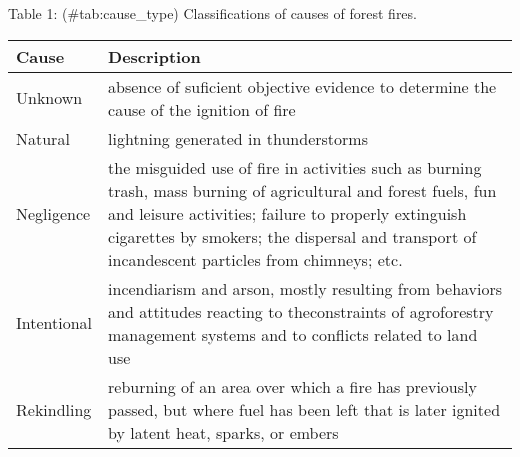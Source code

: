 \documentclass[
  12pt,
]{report}
\begin{document}
Table 1: (\#tab:cause\_type) Classifications of causes of forest fires.

\begin{longtable}[]{@{}ll@{}}
\toprule
\begin{minipage}[b]{0.11\columnwidth}\raggedright
Cause\strut
\end{minipage} & \begin{minipage}[b]{0.83\columnwidth}\raggedright
Description\strut
\end{minipage}\tabularnewline
\midrule
\endhead
\begin{minipage}[t]{0.11\columnwidth}\raggedright
Unknown\strut
\end{minipage} & \begin{minipage}[t]{0.83\columnwidth}\raggedright
absence of suficient objective evidence to determine the cause of the
ignition of fire\strut
\end{minipage}\tabularnewline
\begin{minipage}[t]{0.11\columnwidth}\raggedright
Natural\strut
\end{minipage} & \begin{minipage}[t]{0.83\columnwidth}\raggedright
lightning generated in thunderstorms\strut
\end{minipage}\tabularnewline
\begin{minipage}[t]{0.11\columnwidth}\raggedright
Negligence\strut
\end{minipage} & \begin{minipage}[t]{0.83\columnwidth}\raggedright
the misguided use of fire in activities such as burning trash, mass
burning of agricultural and forest fuels, fun and leisure activities;
failure to properly extinguish cigarettes by smokers; the dispersal and
transport of incandescent particles from chimneys; etc.\strut
\end{minipage}\tabularnewline
\begin{minipage}[t]{0.11\columnwidth}\raggedright
Intentional\strut
\end{minipage} & \begin{minipage}[t]{0.83\columnwidth}\raggedright
incendiarism and arson, mostly resulting from behaviors and attitudes
reacting to theconstraints of agroforestry management systems and to
conflicts related to land use\strut
\end{minipage}\tabularnewline
\begin{minipage}[t]{0.11\columnwidth}\raggedright
Rekindling\strut
\end{minipage} & \begin{minipage}[t]{0.83\columnwidth}\raggedright
reburning of an area over which a fire has previously passed, but where
fuel has been left that is later ignited by latent heat, sparks, or
embers\strut
\end{minipage}\tabularnewline
\bottomrule
\end{longtable}
\end{document}
